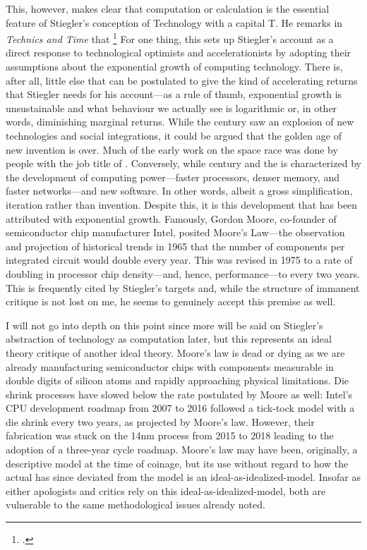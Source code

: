 \documentclass[letterpaper,notitlepage,12pt]{article}
\begin{document}
This, however, makes clear that computation or calculation is the essential
feature of Stiegler's conception of Technology with a capital T.
He remarks in \textit{Technics and Time} that \footcite[p. 19]{stiegler_technics_1998}
For one thing, this sets up Stiegler's account as a direct response to
technological optimists and accelerationists by adopting their assumptions about
the exponential growth of computing technology.
There is, after all, little else that can be postulated to give the kind of
accelerating returns that Stiegler needs for his account---as a rule of thumb,
exponential growth is unsustainable and what behaviour we actually see is
logarithmic or, in other words, diminishing marginal returns.
While the  century saw an explosion of new technologies and social
integrations, it could be argued that the golden age of new invention is over.
Much of the early work on the space race was done by people with the job title
of .
Conversely, while  century and the  is
characterized by the development of computing power---faster processors, denser
memory, and faster networks---and new software.
In other words, albeit a gross simplification, iteration rather than invention.
Despite this, it is this development that has been attributed with exponential
growth.
Famously, Gordon Moore, co-founder of semiconductor chip manufacturer Intel,
posited Moore's Law---the observation and projection of historical trends in
1965 that the number of components per integrated circuit would double every
year.
This was revised in 1975 to a rate of doubling in processor chip density---and,
hence, performance---to every two years.
This  is frequently cited by Stiegler's targets and, while the
structure of immanent critique is not lost on me, he seems to genuinely accept
this premise as well.

I will not go into depth on this point since more will be said on Stiegler's
abstraction of technology as computation later, but this represents an ideal
theory critique of another ideal theory.
Moore's law is dead or dying as we are already manufacturing semiconductor chips
with components measurable in double digits of silicon atoms and rapidly
approaching physical limitations.
Die shrink processes have slowed below the rate postulated by Moore as well:
Intel's CPU development roadmap from 2007 to 2016 followed a tick-tock model
with a die shrink every two years, as projected by Moore's law. However, their
fabrication was stuck on the 14nm process from 2015 to 2018 leading to the
adoption of a three-year cycle roadmap.
Moore's law may have been, originally, a descriptive model at the time of
coinage, but its use without regard to how the actual has since deviated from
the model is an ideal-as-idealized-model.
Insofar as either apologists and critics rely on this ideal-as-idealized-model,
both are vulnerable to the same methodological issues already noted.
\end{document}
